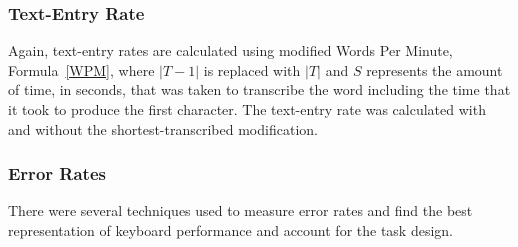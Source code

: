 \begin{table}[h] %
	\centering
	\caption[Backspace-transcribed Examples]{\centering Examples of the backspace-transcribed modification.}
	\label{backspace_presented}
\end{table}

\subsubsection{Text-Entry Rate}
Again, text-entry rates are calculated using modified Words Per Minute, Formula~\ref{WPM}, where $|T-1|$ is replaced with $|T|$ and $S$ represents the amount of time, in seconds, that was taken to transcribe the word including the time that it took to produce the first character. The text-entry rate was calculated with and without the shortest-transcribed modification.

\subsubsection{Error Rates}
There were several techniques used to measure error rates and find the best representation of keyboard performance and account for the task design.

